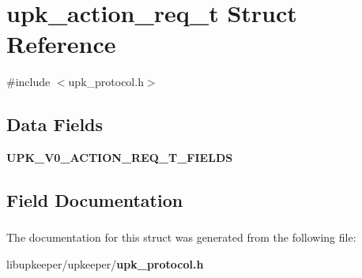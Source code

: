 \section{upk\_\-action\_\-req\_\-t Struct Reference}
\label{structupk__action__req__t}


{\ttfamily \#include $<$upk\_\-protocol.h$>$}

\subsection*{Data Fields}
\begin{DoxyCompactItemize}
\item 
{\bf UPK\_\-V0\_\-ACTION\_\-REQ\_\-T\_\-FIELDS}
\end{DoxyCompactItemize}


\subsection{Field Documentation}
\subsubsection[{UPK\_\-V0\_\-ACTION\_\-REQ\_\-T\_\-FIELDS}]{}\label{structupk__action__req__t_a3df625ce717755d56493f04be07b5ee1}


The documentation for this struct was generated from the following file:\begin{DoxyCompactItemize}
\item 
libupkeeper/upkeeper/{\bf upk\_\-protocol.h}\end{DoxyCompactItemize}
